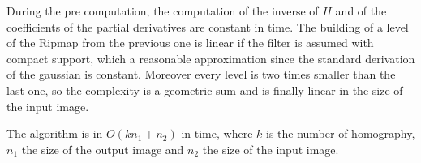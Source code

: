 During the pre computation, the computation of the inverse of $H$ and of the coefficients of the partial derivatives are constant in time. The building of a level of the Ripmap from the previous one is linear if the filter is assumed with compact support, which a reasonable approximation since the standard derivation of the gaussian is constant. Moreover every level is two times smaller than the last one, so the complexity is a geometric sum and is finally linear in the size of the input image.

The algorithm is in $O(k n_1 + n_2)$ in time, where $k$ is the number of homography, $n_1$ the size of the output image and $n_2$ the size of the input image.










